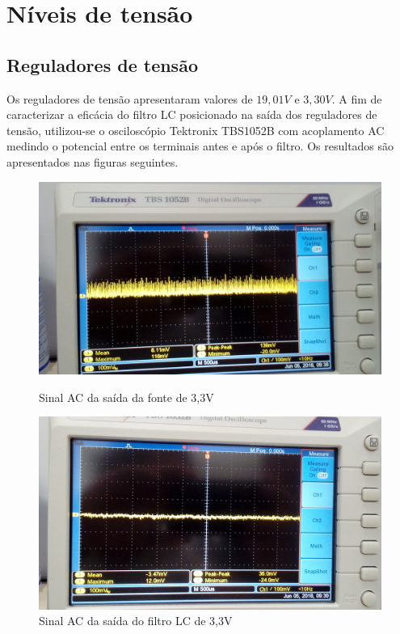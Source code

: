\documentclass[11pt]{abntex2}
\begin{document}
			\section{Níveis de tensão}
				\subsection{Reguladores de tensão}
					Os reguladores de tensão apresentaram valores de $19,01V$ e
					$3,30V$. A fim de caracterizar a eficácia do filtro LC
					posicionado na saída dos reguladores de tensão, utilizou-se o
					osciloscópio Tektronix TBS1052B com acoplamento AC medindo o
					potencial entre os terminais antes e após o filtro. Os
					resultados são apresentados nas figuras seguintes.

					\begin{figure}[!ht]
						\centering
						\begin{minipage}{0.4\linewidth}
							\centering
							\includegraphics[width = \linewidth]{../Fotos/antesFiltro33.jpg}
							\caption{Sinal AC da saída da fonte de 3,3V}
						\end{minipage}
						\hfill\vline\hfill
						\begin{minipage}{0.4\linewidth}
							\centering
							\includegraphics[width = \linewidth]{../Fotos/depoisFiltro33.jpg}
							\caption{Sinal AC da saída do filtro LC de 3,3V}
						\end{minipage}
					\end{figure}
\end{document}
